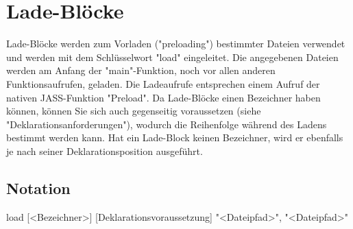 \chapter{Lade-Blöcke}

Lade-Blöcke werden zum Vorladen ("preloading") bestimmter Dateien verwendet und werden mit dem Schlüsselwort "load" eingeleitet.
Die angegebenen Dateien werden am Anfang der "main"-Funktion, noch vor allen anderen Funktionsaufrufen, geladen.
Die Ladeaufrufe entsprechen einem Aufruf der nativen JASS-Funktion "Preload".
Da Lade-Blöcke einen Bezeichner haben können, können Sie sich auch gegenseitig voraussetzen (siehe "Deklarationsanforderungen"),
wodurch die Reihenfolge während des Ladens bestimmt werden kann.
Hat ein Lade-Block keinen Bezeichner, wird er ebenfalls je nach seiner Deklarationsposition ausgeführt.

\section{Notation}
load [<Bezeichner>] [Deklarationsvoraussetzung]
{
	"<Dateipfad>",
	"<Dateipfad>"
} 
